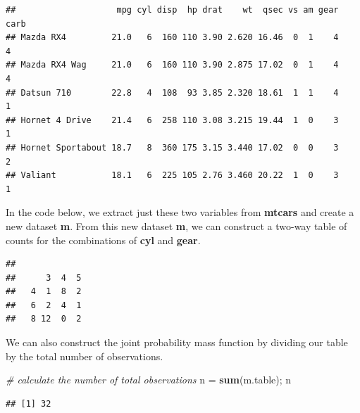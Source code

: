 \documentclass[
  11pt,
  oneside]{book}
\newenvironment{Shaded}{\begin{snugshade}}{\end{snugshade}}
\newcommand{\CommentTok}[1]{\textcolor[rgb]{0.56,0.35,0.01}{\textit{#1}}}
\newcommand{\FunctionTok}[1]{\textcolor[rgb]{0.13,0.29,0.53}{\textbf{#1}}}
\newcommand{\NormalTok}[1]{#1}
\newcommand{\OtherTok}[1]{\textcolor[rgb]{0.56,0.35,0.01}{#1}}
\newcommand{\SpecialCharTok}[1]{\textcolor[rgb]{0.81,0.36,0.00}{\textbf{#1}}}
\newcommand{\StringTok}[1]{\textcolor[rgb]{0.31,0.60,0.02}{#1}}
\theoremstyle{definition}
\theoremstyle{definition}
\theoremstyle{definition}
\theoremstyle{definition}
\theoremstyle{remark}
\begin{document}
\begin{verbatim}
##                    mpg cyl disp  hp drat    wt  qsec vs am gear carb
## Mazda RX4         21.0   6  160 110 3.90 2.620 16.46  0  1    4    4
## Mazda RX4 Wag     21.0   6  160 110 3.90 2.875 17.02  0  1    4    4
## Datsun 710        22.8   4  108  93 3.85 2.320 18.61  1  1    4    1
## Hornet 4 Drive    21.4   6  258 110 3.08 3.215 19.44  1  0    3    1
## Hornet Sportabout 18.7   8  360 175 3.15 3.440 17.02  0  0    3    2
## Valiant           18.1   6  225 105 2.76 3.460 20.22  1  0    3    1
\end{verbatim}

In the code below, we extract just these two variables from \textbf{mtcars} and create a new dataset \textbf{m}. From this new dataset \textbf{m}, we can construct a two-way table of counts for the combinations of \textbf{cyl} and \textbf{gear}.

\begin{Shaded}
\end{Shaded}

\begin{verbatim}
##    
##      3  4  5
##   4  1  8  2
##   6  2  4  1
##   8 12  0  2
\end{verbatim}

\newpage

We can also construct the joint probability mass function by dividing our table by the total number of observations.

\begin{Shaded}
\begin{Highlighting}[]
\CommentTok{\# calculate the number of total observations}
\NormalTok{n }\OtherTok{=} \FunctionTok{sum}\NormalTok{(m.table); n}
\end{Highlighting}
\end{Shaded}

\begin{verbatim}
## [1] 32
\end{verbatim}
\end{document}
